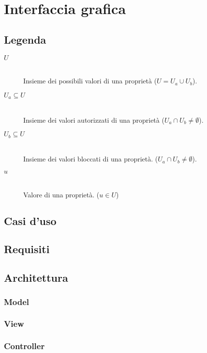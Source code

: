 \chapter{Interfaccia grafica}
\label{ch:appendice:interfaccia-grafica}

\section*{Legenda}
\begin{description}
	\item[$U$] \hfill \\
	Insieme dei possibili valori di una proprietà ($U = U_a \cup U_b$).
	\item[$U_a \subseteq U$] \hfill \\
	Insieme dei valori autorizzati di una proprietà ($U_a \cap U_b \neq \emptyset$).
	\item[$U_b \subseteq U$] \hfill \\
	Insieme dei valori bloccati di una proprietà. ($U_a \cap U_b \neq \emptyset$).
	\item[$u$] \hfill \\
	Valore di una proprietà. ($u \in U$)
\end{description}	

\section*{Casi d'uso}

\section*{Requisiti}

\section*{Architettura}

\subsection*{Model}

\subsection*{View}

\subsection*{Controller}
